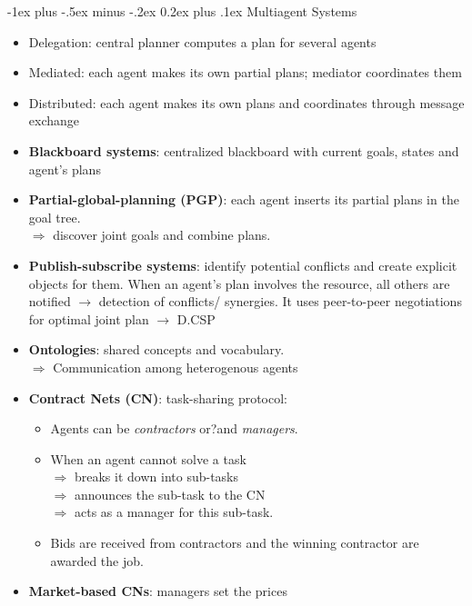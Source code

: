\documentclass[10pt,a4paper,landscape]{article}
\makeatletter
\renewcommand{\section}{\@startsection{section}{1}{0mm}%
                                {-1ex plus -.5ex minus -.2ex}%
                                {0.2ex plus .1ex}%
                                {\normalfont\tiny\bfseries}}
\makeatother
\begin{document}
\begin{multicols*}{5}
\section{Multiagent Systems}
\begin{itemize}
	\item Delegation: central planner computes a plan for several agents
	\item Mediated: each agent makes its own partial plans; mediator coordinates them
	\item Distributed: each agent makes its own plans and coordinates through message exchange
	\item \textbf{Blackboard systems}: centralized blackboard with current goals, states and agent's plans
	\item \textbf{Partial-global-planning (PGP)}: each agent inserts its partial plans in the goal tree. \\
	$\Rightarrow$ discover joint goals and combine plans.
	\item \textbf{Publish-subscribe systems}: identify potential conflicts and create explicit objects for them. When an agent's plan involves the resource, all others are notified $\rightarrow$ detection of conflicts/ synergies. It uses peer-to-peer negotiations for optimal joint plan $\rightarrow$ D.CSP
	\item \textbf{Ontologies}: shared concepts and vocabulary.\\
	$\Rightarrow$ Communication among heterogenous agents

	\item \textbf{Contract Nets (CN)}: task-sharing protocol:
	\begin{itemize}
		\item Agents can be \textit{contractors} or?and \textit{managers}.
		\item When an agent cannot solve a task\\
		$\Rightarrow$ breaks it down into sub-tasks\\
		$\Rightarrow$ announces the sub-task to the CN \\
		$\Rightarrow$ acts as a manager for this sub-task.
		\item Bids are received from contractors and the winning contractor are awarded the job. 
	\end{itemize}

	\item \textbf{Market-based CNs}: managers set the prices
\end{itemize}


\end{multicols*}
\end{document}
